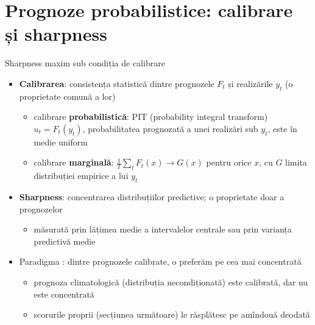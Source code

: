 \section{Prognoze probabilistice: calibrare și sharpness}

\begin{frame}{Sharpness maxim sub condiția de calibrare}
\itemsize{\small}
\begin{itemize}
    \item \textbf{Calibrarea}: consistența statistică dintre prognozele $F_t$ și realizările $y_t$ (o proprietate comună a lor) 
    \begin{itemize}
        \item calibrare \textbf{probabilistică}: PIT (probability integral transform) $u_t = F_t(y_t)$, probabilitatea prognozată a unei realizări sub $y_t$, este în medie uniform
        \item calibrare \textbf{marginală}: $\frac1T\sum_t F_t(x) \to G(x)$ pentru orice $x$, cu $G$ limita distribuției empirice a lui $y_t$
    \end{itemize}
    \item \textbf{Sharpness}: concentrarea distribuțiilor predictive; o proprietate doar a prognozelor
    \begin{itemize}
        \item măsurată prin lățimea medie a intervalelor centrale sau prin varianța predictivă medie
    \end{itemize}
    \item Paradigma : dintre prognozele calibrate, o preferăm pe cea mai concentrată
    \begin{itemize}
        \item prognoza climatologică (distribuția necondiționată) este calibrată, dar nu este concentrată
        \item scorurile proprii (secțiunea următoare) le răsplătesc pe amîndouă deodată
    \end{itemize}
\end{itemize}
\end{frame}


